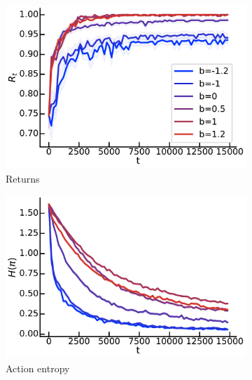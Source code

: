\begin{figure}[!ht]
\centering
  \begin{subfigure}[b]{0.32\linewidth}
    \includegraphics[width=\textwidth]{articles/baselines/figs/5x5_plots/entropy_return}
    \caption{Returns}
    \label{fig:5x5_return}
  \end{subfigure}
    \begin{subfigure}[b]{0.32\linewidth}
    \includegraphics[width=\textwidth]{articles/baselines/figs/5x5_plots/entropy_pi}
    \caption{Action entropy}
    \label{fig:5x5_action}
  \end{subfigure}
  \begin{subfigure}[b]{0.32\linewidth}

\end{subfigure}
\end{figure}
